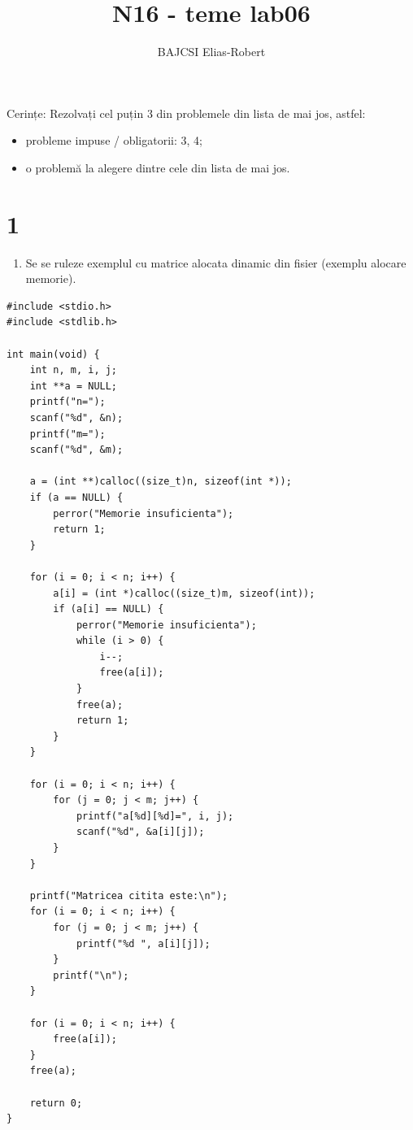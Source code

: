 \documentclass[11pt]{article}
\author{BAJCSI Elias-Robert}
\date{}
\title{N16 - teme lab06}
\begin{document}
\maketitle
Cerințe:
Rezolvați cel puțin 3 din problemele din lista de mai jos, astfel:
\begin{itemize}
\item probleme impuse / obligatorii: 3, 4;
\item o problemă la alegere dintre cele din lista de mai jos.
\end{itemize}
\section{1}
\label{sec:orgb4e2c2c}
\begin{enumerate}
\item Se se ruleze exemplul cu matrice alocata dinamic din fisier (exemplu alocare memorie).
\end{enumerate}
\begin{verbatim}
#include <stdio.h>
#include <stdlib.h>

int main(void) {
    int n, m, i, j;
    int **a = NULL;
    printf("n=");
    scanf("%d", &n);
    printf("m=");
    scanf("%d", &m);

    a = (int **)calloc((size_t)n, sizeof(int *));
    if (a == NULL) {
        perror("Memorie insuficienta");
        return 1;
    }

    for (i = 0; i < n; i++) {
        a[i] = (int *)calloc((size_t)m, sizeof(int));
        if (a[i] == NULL) {
            perror("Memorie insuficienta");
            while (i > 0) {
                i--;
                free(a[i]);
            }
            free(a);
            return 1;
        }
    }

    for (i = 0; i < n; i++) {
        for (j = 0; j < m; j++) {
            printf("a[%d][%d]=", i, j);
            scanf("%d", &a[i][j]);
        }
    }

    printf("Matricea citita este:\n");
    for (i = 0; i < n; i++) {
        for (j = 0; j < m; j++) {
            printf("%d ", a[i][j]);
        }
        printf("\n");
    }

    for (i = 0; i < n; i++) {
        free(a[i]);
    }
    free(a);

    return 0;
}
\end{verbatim}
\end{document}
